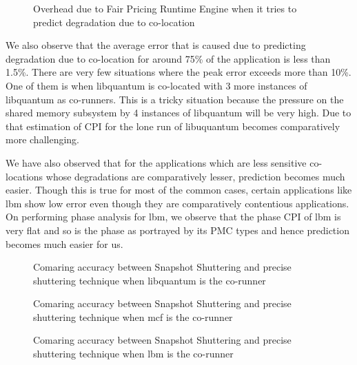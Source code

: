 \documentclass[pageno]{jpaper}
\begin{document}
\begin{figure*}
\centering
\begin{minipage}[t]{2\columnwidth}
\centering
{}
\caption{Overhead due to Fair Pricing Runtime Engine when it tries to predict degradation due to co-location}
\label{fig:overhead}
\end{minipage}
\end{figure*}

We also observe that the average error that is caused due to predicting degradation due to co-location for around 75\% of the application is less than 1.5\%. There are very few situations where the peak error exceeds more than 10\%. One of them is when libquantum is co-located with 3 more instances of libquantum as co-runners. This is a tricky situation because the pressure on the shared memory subsystem by 4 instances of libquantum will be very high. Due to that estimation of CPI for the lone run of libuquantum becomes comparatively more challenging.

We have also observed that for the applications which are less sensitive co-locations whose degradations are comparatively lesser, prediction becomes much easier. Though this is true for most of the common cases, certain applications like lbm show low error even though they are comparatively contentious applications. On performing phase analysis for lbm, we observe that the phase CPI of lbm is very flat and so is the phase as portrayed by its PMC types and hence prediction becomes much easier for us.
\begin{figure*}
\centering
\begin{minipage}[t]{0.66\columnwidth}
\centering
{}
\caption{Comaring accuracy between Snapshot Shuttering and precise shuttering technique when libquantum is the co-runner}
\label{fig:compareaccuracy}
\end{minipage}
\hfill\begin{minipage}[t]{0.66\columnwidth}
\centering
{}
\caption{Comaring accuracy between Snapshot Shuttering and precise shuttering technique when mcf is the co-runner}
\label{fig:compareaccuracy2}
\end{minipage}
\hfill
\begin{minipage}[t]{0.66\columnwidth}
\centering
{}
\caption{Comaring accuracy between Snapshot Shuttering and precise shuttering technique when lbm is the co-runner}
\label{fig:compareaccuracy3}
\end{minipage}
\end{figure*}
\end{document}
